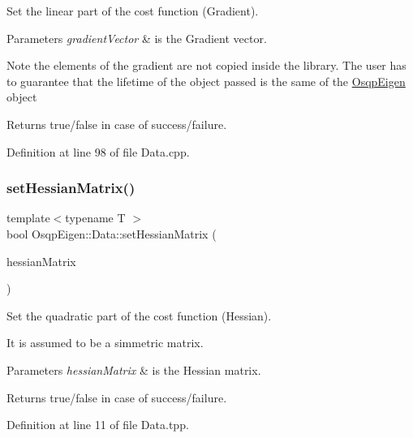 Set the linear part of the cost function (Gradient). 


\begin{DoxyParams}{Parameters}
{\em gradient\+Vector} & is the Gradient vector. \\
\hline
\end{DoxyParams}
\begin{DoxyNote}{Note}
the elements of the gradient are not copied inside the library. The user has to guarantee that the lifetime of the object passed is the same of the \mbox{\hyperlink{namespaceOsqpEigen}{Osqp\+Eigen}} object 
\end{DoxyNote}
\begin{DoxyReturn}{Returns}
true/false in case of success/failure. 
\end{DoxyReturn}


Definition at line 98 of file Data.\+cpp.

\mbox{\label{classOsqpEigen_1_1Data_a58dfe4bfbb1b843736496eea9d0acfb7}} 
\subsubsection{\texorpdfstring{set\+Hessian\+Matrix()}{setHessianMatrix()}\hspace{0.1cm}{\footnotesize\ttfamily [1/2]}}
{\footnotesize\ttfamily template$<$typename T $>$ \\
bool Osqp\+Eigen\+::\+Data\+::set\+Hessian\+Matrix (\begin{DoxyParamCaption}\item[{const Eigen\+::\+Sparse\+Matrix$<$ T $>$ \&}]{hessian\+Matrix }\end{DoxyParamCaption})}



Set the quadratic part of the cost function (Hessian). 

It is assumed to be a simmetric matrix. 
\begin{DoxyParams}{Parameters}
{\em hessian\+Matrix} & is the Hessian matrix. \\
\hline
\end{DoxyParams}
\begin{DoxyReturn}{Returns}
true/false in case of success/failure. 
\end{DoxyReturn}


Definition at line 11 of file Data.\+tpp.



